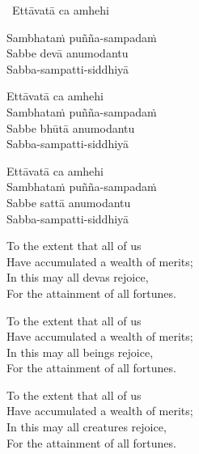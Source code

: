 \begin{leader-only}
  \anglebracketleft\ \hspace{-0.5mm}Ettāvatā ca amhehi \hspace{-0.5mm}\anglebracketright\ \\
\end{leader-only}

\vspace{-0.99em}

Sambhataṁ puñña-sampadaṁ\\
Sabbe devā anumodantu\\
Sabba-sampatti-siddhiyā

Ettāvatā ca amhehi\\
Sambhataṁ puñña-sampadaṁ\\
Sabbe bhūtā anumodantu\\
Sabba-sampatti-siddhiyā

Ettāvatā ca amhehi\\
Sambhataṁ puñña-sampadaṁ\\
Sabbe sattā anumodantu\\
Sabba-sampatti-siddhiyā


\clearpage

\begin{english-verses}
  To the extent that all of us\\
  Have accumulated a wealth of merits;\\
  In this may all devas rejoice,\\
  For the attainment of all fortunes.
\end{english-verses}

\begin{english-verses}
  To the extent that all of us\\
  Have accumulated a wealth of merits;\\
  In this may all beings rejoice,\\
  For the attainment of all fortunes.
\end{english-verses}

\begin{english-verses}
  To the extent that all of us\\
  Have accumulated a wealth of merits;\\
  In this may all creatures rejoice,\\
  For the attainment of all fortunes.
\end{english-verses}

